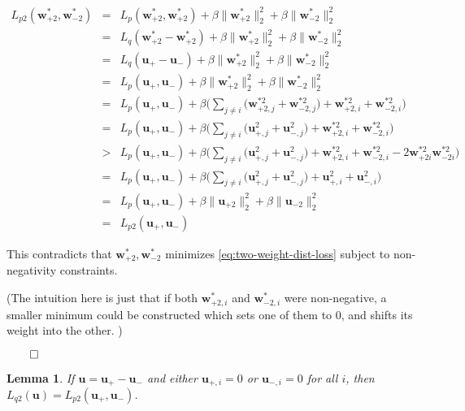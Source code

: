 \documentclass[11pt,letterpaper]{article}
\newtheorem{lemma}{Lemma}[section]
\begin{document}
\begin{eqnarray}
L_{p2}(\mathbf{w}^*_{+2},\mathbf{w}^*_{-2}) 
& = & L_p(\mathbf{w}^*_{+2},\mathbf{w}^*_{+2})+\beta \| \mathbf{w}^*_{+2}\|^2_2+\beta \|\mathbf{w}^*_{-2}\|^2_2 \\
& = & L_q(\mathbf{w}^*_{+2}-\mathbf{w}^*_{+2})+\beta \| \mathbf{w}^*_{+2}\|^2_2+\beta \|\mathbf{w}^*_{-2}\|^2_2 \\
& = & L_q(\mathbf{u}_+-\mathbf{u}_-)+\beta \| \mathbf{w}^*_{+2}\|^2_2+\beta \|\mathbf{w}^*_{-2}\|^2_2 \\
& = & L_p(\mathbf{u}_+,\mathbf{u}_-)+\beta \| \mathbf{w}^*_{+2}\|^2_2+\beta \|\mathbf{w}^*_{-2}\|^2_2 \\
& = & L_p(\mathbf{u}_+,\mathbf{u}_-)+\beta\Big( \sum_{j\neq i}\big( \mathbf{w}^{*2}_{+2,j}+\mathbf{w}^{*2}_{-2,j}\big) +\mathbf{w}^{*2}_{+2,i}+\mathbf{w}^{*2}_{-2,i} \Big) \\
& = & L_p(\mathbf{u}_+,\mathbf{u}_-)+\beta\Big( \sum_{j\neq i}\big( \mathbf{u}^2_{+,j}+\mathbf{u}^2_{-,j}\big) +\mathbf{w}^{*2}_{+2,i}+\mathbf{w}^{*2}_{-2,i} \Big) \\
& > & L_p(\mathbf{u}_+,\mathbf{u}_-)+\beta\Big( \sum_{j\neq i}\big( \mathbf{u}^2_{+,j}+\mathbf{u}^2_{-,j}\big) +\mathbf{w}^{*2}_{+2,i}+\mathbf{w}^{*2}_{-2,i} - 2\mathbf{w}^{*2}_{+2i}\mathbf{w}^{*2}_{-2i} \Big) \\
& = & L_p(\mathbf{u}_+,\mathbf{u}_-)+\beta\Big( \sum_{j\neq i}\big( \mathbf{u}^2_{+,j}+\mathbf{u}^2_{-,j}\big)+\mathbf{u}^2_{+,i}+\mathbf{u}^2_{-,i}\Big) \\
& = & L_p(\mathbf{u}_+,\mathbf{u}_-)+\beta \| \mathbf{u}_{+2}\|^2_2+\beta \|\mathbf{u}_{-2}\|^2_2 \\
& = & L_{p2}(\mathbf{u}_+,\mathbf{u}_-)
\end{eqnarray}

This contradicts that $\mathbf{w}^*_{+2},\mathbf{w}^*_{-2}$ minimizes 
\ref{eq:two-weight-dist-loss} subject to non-negativity constraints.

(The intuition here is just that if both $\mathbf{w}^*_{+2,i}$ and $\mathbf{w}^*_{-2,i}$
were non-negative, a smaller minimum could be constructed which
sets one of them to $0$, and shifts its weight into the other.
)

$\qed$

\begin{lemma}
\label{lemma:lp2-lq2}
If $\mathbf{u}=\mathbf{u}_+-\mathbf{u}_-$ and either $\mathbf{u}_{+,i}=0$ or $\mathbf{u}_{-,i}=0$ for all $i$, then
$L_{q2}(\mathbf{u})=L_{p2}(\mathbf{u}_+,\mathbf{u}_-)$.
\end{lemma}
\end{document}
